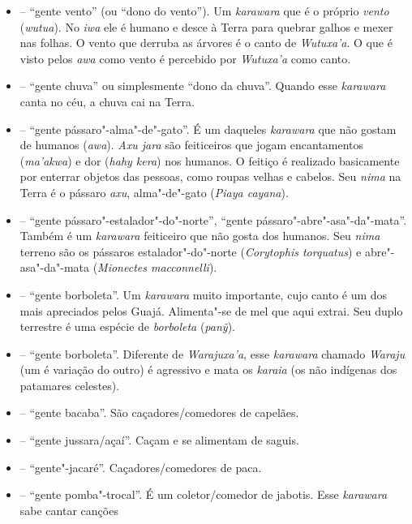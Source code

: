 \begin{itemize}
\item
  \emph{} -- ``gente vento'' (ou ``dono do
  vento''). Um \emph{karawara} que é o próprio \emph{vento}
  (\emph{wutua}). No \emph{iwa} ele é humano e desce à Terra para
  quebrar galhos e mexer nas folhas. O vento que derruba as árvores é o
  canto de \emph{Wutuxa'a}. O que é visto pelos \emph{awa} como vento é
  percebido por \emph{Wutuxa'a} como canto.
\item
  \emph{} -- ``gente chuva'' ou simplesmente ``dono da
  chuva''. Quando esse \emph{karawara} canta no céu, a chuva cai na
  Terra.
\item
  \emph{} -- ``gente pássaro"-alma"-de"-gato''. É um
  daqueles \emph{karawara} que não gostam de humanos (\emph{awa}).
  \emph{Axu jara} são feiticeiros que jogam encantamentos
  (\emph{ma'akwa}) e dor (\emph{hahy kera}) nos humanos. O feitiço é
  realizado basicamente por enterrar objetos das pessoas, como roupas
  velhas e cabelos. Seu \emph{nima} na Terra é o pássaro \emph{axu},
  alma"-de"-gato (\emph{Piaya cayana}).
\item
  \emph{} -- ``gente pássaro"-estalador"-do"-norte'',
  ``gente pássaro"-abre"-asa"-da"-mata''. Também é um \emph{karawara}
  feiticeiro que não gosta dos humanos. Seu \emph{nima} terreno são os
  pássaros estalador"-do"-norte (\emph{Corytophis torquatus}) e
  abre"-asa"-da"-mata (\emph{Mionectes macconnelli}).
\item
  \emph{} -- ``gente borboleta''. Um \emph{karawara}
  muito importante, cujo canto é um dos mais apreciados pelos Guajá.
  Alimenta"-se de mel que aqui extrai. Seu duplo terrestre é uma espécie
  de \emph{borboleta} (\emph{panỹ}).
\item
  \emph{} -- ``gente borboleta''. Diferente de
  \emph{Warajuxa'a}, esse \emph{karawara} chamado \emph{Waraju} (um é
  variação do outro) é agressivo e mata os \emph{karaia} (os não
  indígenas dos patamares celestes).
\item
  \emph{} -- ``gente bacaba''. São
  caçadores/comedores de capelães.
\item
  \emph{} -- ``gente jussara/açaí''. Caçam e se
  alimentam de saguis.
\item
  \emph{} -- ``gente"-jacaré''. Caçadores/comedores
  de paca.
\item
  \emph{} -- ``gente pomba"-trocal''. É um
  coletor/comedor de jabotis. Esse \emph{karawara} sabe cantar canções

\end{itemize}
